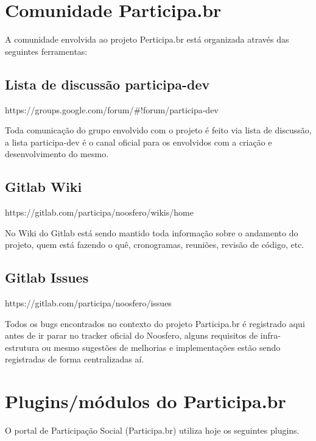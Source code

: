 \documentclass[11pt]{article}
\begin{document}
\section{Comunidade Participa.br}

A comunidade envolvida ao projeto Perticipa.br está organizada através
das seguintes ferramentas:

\subsection{Lista de discussão participa-dev}

https://groups.google.com/forum/\#!forum/participa-dev

Toda comunicação do grupo envolvido com o projeto é feito via lista de
discussão, a lista participa-dev é o canal oficial para os envolvidos com a
criação e desenvolvimento do mesmo.

\subsection{Gitlab Wiki}

https://gitlab.com/participa/noosfero/wikis/home

No Wiki do Gitlab está sendo mantido toda informação sobre o andamento
do projeto, quem está fazendo o quê, cronogramas, reuniões, revisão de código,
etc.

\subsection{Gitlab Issues}

https://gitlab.com/participa/noosfero/issues

Todos os bugs encontrados no contexto do projeto Participa.br é registrado
aqui antes de ir parar no tracker oficial do Noosfero, alguns requisitos de
infra-estrutura ou mesmo sugestões de melhorias e implementações estão sendo
registradas de forma centralizadas aí.

\section{Plugins/módulos do Participa.br}

O portal de Participação Social (Participa.br) utiliza hoje os seguintes
plugins.
\end{document}
